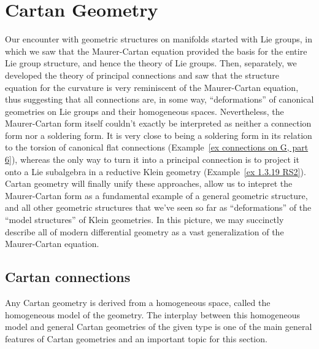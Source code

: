 \chapter{Cartan Geometry \texorpdfstring{\ucmark}{}}\label{ch: cartan geom}


Our encounter with geometric structures on manifolds started with Lie groups, in which we saw that the Maurer-Cartan equation provided the basis for the entire Lie group structure, and hence the theory of Lie groups. Then, separately, we developed the theory of principal connections and saw that the structure equation for the curvature is very reminiscent of the Maurer-Cartan equation, thus suggesting that all connections are, in some way, ``deformations'' of canonical geometries on Lie groups and their homogeneous spaces. Nevertheless, the Maurer-Cartan form itself couldn't exactly be interpreted as neither a connection form nor a soldering form. It is very close to being a soldering form in its relation to the torsion of canonical flat connections (Example~\ref{ex connections on G, part 6}), whereas the only way to turn it into a principal connection is to project it onto a Lie subalgebra in a reductive Klein geometry (Example~\ref{ex 1.3.19 RS2}). Cartan geometry will finally unify these approaches, allow us to intepret the Maurer-Cartan form as a fundamental example of a general geometric structure, and all other geometric structures that we've seen so far as ``deformations'' of the ``model structures'' of Klein geometries. In this picture, we may succinctly describe all of modern differential geometry as a vast generalization of the Maurer-Cartan equation.






\section{Cartan connections}

Any Cartan geometry is derived from a homogeneous space, called the homogeneous model of the geometry. The interplay between this homogeneous model and general Cartan geometries of the given type is one of the main general features of Cartan geometries and an important topic for this section.


